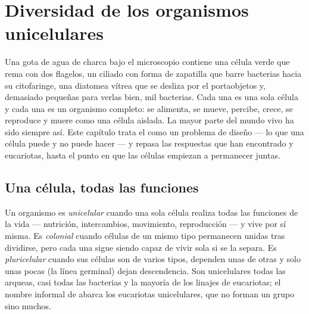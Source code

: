 \chapter{Diversidad de los organismos unicelulares}\label{ch:b2:unicellular-diversity}

Una gota de agua de charca bajo el microscopio contiene una célula verde
que rema con dos flagelos, un ciliado con forma de zapatilla que barre
bacterias hacia su citofaringe, una diatomea vítrea que se desliza por el
portaobjetos y, demasiado pequeñas para verlas bien, mil bacterias. Cada
una es una sola célula y cada una es un organismo completo: se alimenta,
se mueve, percibe, crece, se reproduce y muere como una célula aislada.
La mayor parte del mundo vivo ha sido siempre así. Este capítulo trata el
 como un problema de diseño --- lo que una célula
puede y no puede hacer --- y repasa las respuestas que han encontrado
 y eucariotas, hasta el punto en que las células empiezan a
permanecer juntas.

\section{Una célula, todas las funciones}

\begin{definition}\label{def:b2:unicellular-diversity:unicellular}
Un organismo es \emph{unicelular} cuando una
sola célula realiza todas las funciones de la vida --- nutrición,
intercambios, movimiento, reproducción --- y vive por sí misma. Es
\emph{colonial} cuando células de un mismo tipo
permanecen unidas tras dividirse, pero cada una sigue siendo capaz de
vivir sola si se la separa. Es \emph{pluricelular}
cuando sus células son de varios tipos, dependen unas de otras y solo
unas pocas (la línea germinal) dejan descendencia. Son unicelulares
todas las arqueas, casi todas las bacterias y la mayoría de los linajes
de eucariotas; el nombre informal de \emph{} abarca los
eucariotas unicelulares, que no forman un grupo sino muchos.
\end{definition}

